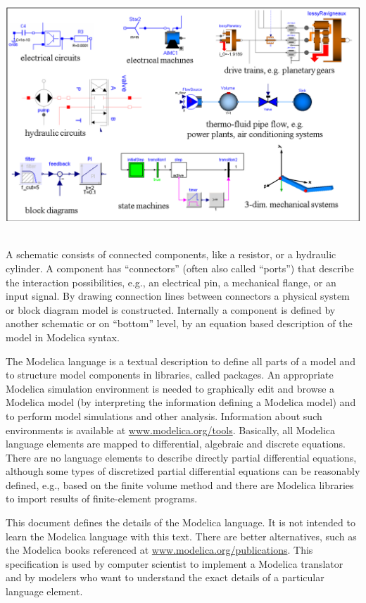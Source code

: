 \documentclass[10pt,a4paper]{report}
\begin{document}
\includegraphics[width=5.92986in,height=3.59167in]{media/image2.png}

A schematic consists of connected components, like a resistor, or a
hydraulic cylinder. A component has ``connectors'' (often also called
``ports'') that describe the interaction possibilities, e.g., an
electrical pin, a mechanical flange, or an input signal. By drawing
connection lines between connectors a physical system or block diagram
model is constructed. Internally a component is defined by another
schematic or on ``bottom'' level, by an equation based description of
the model in Modelica syntax.

The Modelica language is a textual description to define all parts of a
model and to structure model components in libraries, called packages.
An appropriate Modelica simulation environment is needed to graphically
edit and browse a Modelica model (by interpreting the information
defining a Modelica model) and to perform model simulations and other
analysis. Information about such environments is available at
\href{http://www.modelica.org/tools}{www.modelica.org/tools}. Basically,
all Modelica language elements are mapped to differential, algebraic and
discrete equations. There are no language elements to describe directly
partial differential equations, although some types of discretized
partial differential equations can be reasonably defined, e.g., based on
the finite volume method and there are Modelica libraries to import
results of finite-element programs.

This document defines the details of the Modelica language. It is not
intended to learn the Modelica language with this text. There are better
alternatives, such as the Modelica books referenced at
\href{http://www.modelica.org/publications}{www.modelica.org/publications}.
This specification is used by computer scientist to implement a Modelica
translator and by modelers who want to understand the exact details of a
particular language element.
\end{document}
